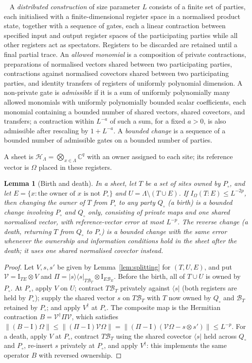 \documentclass[aps,prx,reprint,superscriptaddress,floatfix,nofootinbib,longbibliography,amsmath,amssymb]{revtex4-2}
\newcommand{\C}{\mathbb C}
\newcommand{\id}{\mathrm{I}}
\newcommand{\norm}[1]{\lVert #1\rVert}
\providecommand{\ket}[1]{|#1\rangle}\renewcommand{\ket}[1]{|#1\rangle}
\providecommand{\bra}[1]{\langle #1|}\renewcommand{\bra}[1]{\langle #1|}
\newcommand{\cH}{\mathcal H}
\newcommand{\cB}{\mathcal B}
\newcommand{\Om}{\Omega}
\newcommand{\Lam}{\Lambda}
\theoremstyle{plain}
\newtheorem{lemma}[theorem]{Lemma}
\theoremstyle{definition}
\newcommand{\precisely}{\par\noindent{\bfseries Precisely.}\ }
\begin{document}
\precisely
A \emph{distributed construction} of size parameter $L$ consists of a
finite set of parties, each initialised with a finite-dimensional register
space in a normalised product state, together with a sequence of gates,
each a linear contraction between specified input and output register
spaces of the participating parties while all other registers act as
spectators. Registers to be discarded are retained until a final partial
trace. An \emph{allowed monomial} is a composition of private
contractions, preparations of normalised vectors shared between two
participating parties, contractions against normalised covectors shared
between two participating parties, and identity transfers of registers of
uniformly polynomial dimension. A non-private gate is \emph{admissible} if
it is a sum of uniformly polynomially many allowed monomials with
uniformly polynomially bounded scalar coefficients, each monomial
containing a bounded number of shared vectors, shared covectors, and
transfers; a contraction within $L^{-a}$ of such a sum, for a fixed $a>0$,
is also admissible after rescaling by $1+L^{-a}$. A \emph{bounded change}
is a sequence of a bounded number of admissible gates on a bounded number
of parties.

A sheet is $\cH_\Lam=\bigotimes_{x\in\Lam}\C^q$ with an owner assigned to
each site; its reference vector is $\Om$ placed in these registers.

\begin{lemma}[Birth and death]\label{lem:birth}
In a sheet, let $T$ be a set of sites owned by $P_\circ$, and let
$E=\{x:\text{the owner of }x\text{ is not }P_\circ\}$ and
$U=\Lam\setminus(T\cup E)$. If $I_\Om(T:E)\le L^{-2p}$, then changing the
owner of $T$ from $P_\circ$ to any party $Q_\circ$ (a \emph{birth}) is a bounded
change involving $P_\circ$ and $Q_\circ$ only, consisting of private maps and one
shared normalised vector, with reference-vector error at most $L^{-p}$.
The reverse change (a \emph{death}, returning $T$ from $Q_\circ$ to
$P_\circ$) is a bounded change with the same error whenever the
ownership and information conditions hold in the sheet \emph{after} the
death; it uses one shared normalised covector instead.
\end{lemma}
\begin{proof}
Let $V,s,s'$ be given by Lemma~\ref{lem:splitting} for $(T,U,E)$, and put
$\mathcal V=\id_{TE}\otimes V$ and $\Pi=\ket s\bra s_{T\cB_T}\otimes\id_{E\cB_E}$.
Before the birth, all of $T\cup U$ is owned by $P_\circ$. At $P_\circ$, apply $V$ on $U$; contract
$T\cB_T$ privately against $\bra s$ (both registers are held by $P_\circ$); supply the shared
vector $s$ on $T\cB_T$ with $T$ now owned by $Q_\circ$ and $\cB_T$ retained by
$P_\circ$; and apply $V^\dagger$ at $P_\circ$. The composite map is the Hermitian
contraction $B=\mathcal V^\dagger\Pi\mathcal V$, which satisfies
$\norm{(B-\id)\Om}\le\norm{(\Pi-\id)\mathcal V\Om}=\norm{(\Pi-\id)(\mathcal V\Om-s\otimes s')}\le L^{-p}$.
For a death, apply $V$ at $P_\circ$, contract $T\cB_T$ using the shared covector $\bra s$
held across $Q_\circ$ and $P_\circ$, re-insert $s$ privately at $P_\circ$, and
apply $V^\dagger$: this implements the same operator $B$ with reversed ownership.
\end{proof}
\end{document}
